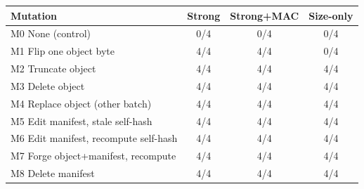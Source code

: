 
\begin{tabular}{@{}lccc@{}}
\toprule
Mutation & Strong & Strong+MAC & Size-only \\
\midrule
M0 None (control) & 0/4 & 0/4 & 0/4 \\
M1 Flip one object byte & 4/4 & 4/4 & 0/4 \\
M2 Truncate object & 4/4 & 4/4 & 4/4 \\
M3 Delete object & 4/4 & 4/4 & 4/4 \\
M4 Replace object (other batch) & 4/4 & 4/4 & 4/4 \\
M5 Edit manifest, stale self-hash & 4/4 & 4/4 & 4/4 \\
M6 Edit manifest, recompute self-hash & 4/4 & 4/4 & 4/4 \\
M7 Forge object+manifest, recompute & 4/4 & 4/4 & 4/4 \\
M8 Delete manifest & 4/4 & 4/4 & 4/4 \\
\bottomrule
\end{tabular}
